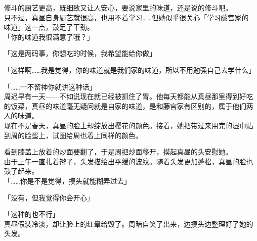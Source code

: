 修斗的厨艺更高，既细致又让人安心，要说家里的味道，还是说的修斗吧。\\

只不过，真昼自身厨艺就很高，也用不着学习……但她似乎很关心「学习藤宫家的味道」这一点，鼓足了干劲。\\

「你的味道我很满意了哦？」

「这是两码事，你想吃的时候，我希望能给你做」

「这样啊……我是觉得，你的味道就是我们家的味道，所以不用勉强自己去学什么」

「……一不留神你就讲这种话」\\

周迟早有一天——不如说现在就已经被抓住了胃。他每天都能从真昼那里得到好吃的饭菜，真昼的味道毫无疑问就是自家的味道，是和藤宫家有区别的，属于他们两人的味道。\\

现在不是春天，真昼的脸上却绽放出樱花的颜色。接着，她把带过来用完的湿巾贴到周的脸蛋上，试图给周也着上同样的颜色。

看到膝盖上放着的炒面要翻了，于是周把炒面移开，摸起真昼的头安慰她。\\

由于上午一直扎着辫子，头发描绘出平缓的波纹。随着头发更加蓬松，真昼的脸也鼓了起来。\\

「……你是不是觉得，摸头就能糊弄过去」

「没有，但我觉得你会开心」

「这种的也不行」\\

真昼假装冷淡，却让脸上的红晕给毁了。周暗自笑了出来，边摸头边整理好了她的头发。
